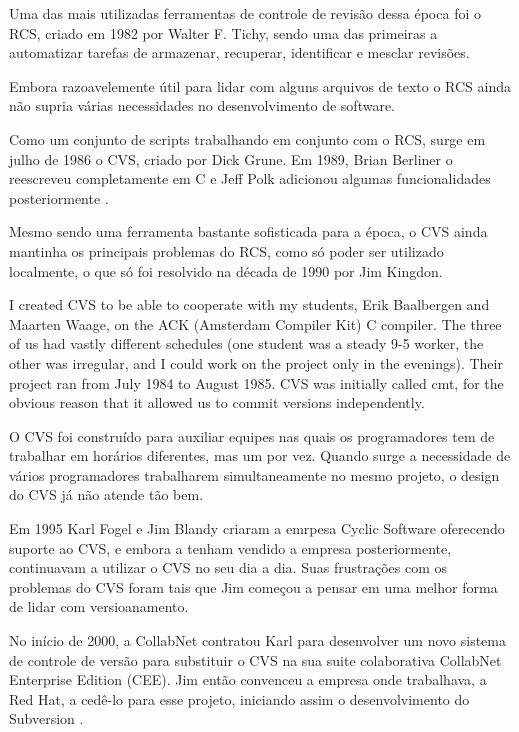 Uma das mais utilizadas ferramentas de controle de revisão dessa época
foi o RCS, criado em 1982 por Walter F. Tichy, sendo uma das primeiras
a automatizar tarefas de armazenar, recuperar, identificar e mesclar
revisões.

Embora razoavelemente útil para lidar com alguns arquivos de texto
o RCS ainda não supria várias necessidades no desenvolvimento de software.

Como um conjunto de scripts trabalhando em conjunto com o RCS, surge em
julho de 1986 o CVS, criado por Dick Grune. Em 1989, Brian Berliner o
reescreveu completamente em C e Jeff Polk adicionou algumas
funcionalidades posteriormente \cite{Bar}.

Mesmo sendo uma ferramenta bastante sofisticada para a época, o CVS ainda
mantinha os principais problemas do RCS, como só poder
ser utilizado localmente, o que só foi resolvido na década de 1990 por
Jim Kingdon.

\begin{citacao}
I created CVS to be able to cooperate with my students, Erik Baalbergen and Maarten Waage, on the ACK (Amsterdam Compiler Kit) C compiler. The three of us had vastly different schedules (one student was a steady 9-5 worker, the other was irregular, and I could work on the project only in the evenings). Their project ran from July 1984 to August 1985. CVS was initially called cmt, for the obvious reason that it allowed us to commit versions independently.\\

\cite{Grune}
\end{citacao}

O CVS foi construído para auxiliar equipes nas quais os programadores tem
de trabalhar em horários diferentes, mas um por vez. Quando surge a necessidade
de vários programadores trabalharem simultaneamente no mesmo projeto, o design
do CVS já não atende tão bem.

Em 1995 Karl Fogel e Jim Blandy criaram a emrpesa Cyclic Software oferecendo
suporte ao CVS, e embora a tenham vendido a empresa posteriormente, continuavam
a utilizar o CVS no seu dia a dia. Suas frustrações com os problemas do CVS
foram tais que Jim começou a pensar em uma melhor forma de lidar com
versioanamento.

No início de 2000, a CollabNet contratou Karl para desenvolver um novo
sistema de controle de versão para substituir o CVS na sua suite colaborativa
CollabNet Enterprise Edition (CEE). Jim então convenceu a empresa onde trabalhava,
a Red Hat, a cedê-lo para esse projeto, iniciando assim o desenvolvimento
do Subversion \cite{Sussman}.


